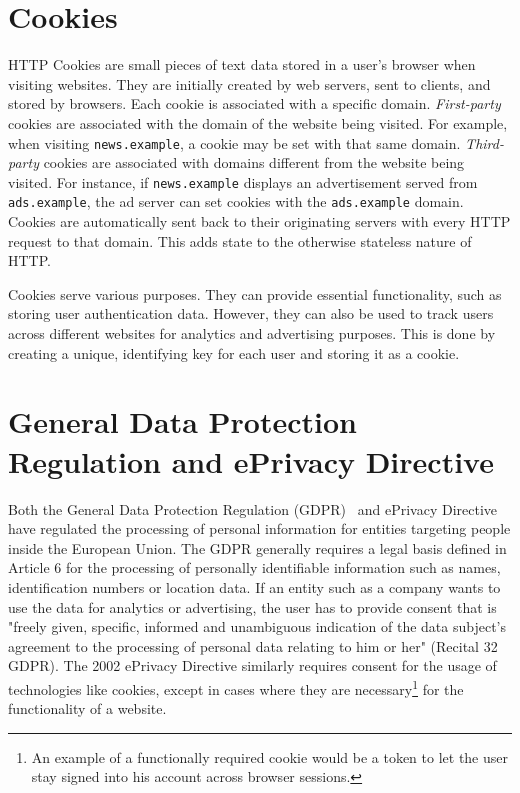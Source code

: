 \section{Cookies}
HTTP Cookies are small pieces of text data stored in a user's browser when visiting websites. 
They are initially created by web servers, sent to clients, and stored by browsers. 
Each cookie is associated with a specific domain.
\emph{First-party} cookies are associated with the domain of the website being visited.
For example, when visiting \verb|news.example|, a cookie may be set with that same domain.
\emph{Third-party} cookies are associated with domains different from the website being visited. 
For instance, if \verb|news.example| displays an advertisement served from \verb|ads.example|, the ad server can set cookies with the \verb|ads.example| domain.
Cookies are automatically sent back to their originating servers with every HTTP request to that domain. 
This adds state to the otherwise stateless nature of HTTP.

Cookies serve various purposes. 
They can provide essential functionality, such as storing user authentication data. 
However, they can also be used to track users across different websites for analytics and advertising purposes.
This is done by creating a unique, identifying key for each user and storing it as a cookie.
\color{black}

\section{General Data Protection Regulation and ePrivacy Directive} \label{sec:legal}
Both the General Data Protection Regulation (GDPR)~\cite{gdpr2016} and ePrivacy Directive~\cite{privacydirective2016} have regulated the processing of personal information for entities targeting people inside the European Union.
The GDPR generally requires a legal basis defined in Article 6 for the processing of personally identifiable information such as names, identification numbers or location data.
If an entity such as a company wants to use the data for analytics or advertising, the user has to provide consent that is "freely given, specific, informed and unambiguous indication of the data subject's agreement to the processing of personal data relating to him or her" (Recital 32 GDPR).
The 2002 ePrivacy Directive similarly requires consent for the usage of technologies like cookies, except in cases where they are necessary\footnote{An example of a functionally required cookie would be a token to let the user stay signed into his account across browser sessions.} for the functionality of a website.
